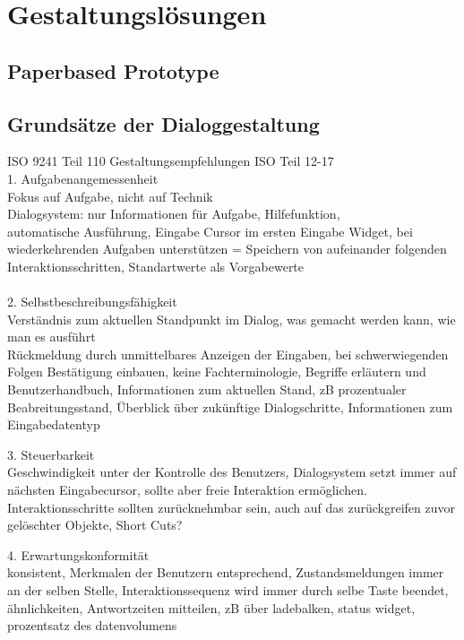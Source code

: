 
\section{Gestaltungslösungen}
\subsection{Paperbased Prototype}

\subsection{Grundsätze der Dialoggestaltung}
 ISO 9241 Teil 110
 Gestaltungsempfehlungen ISO Teil 12-17
\\
 1. Aufgabenangemessenheit\\
 	Fokus auf Aufgabe, nicht auf Technik\\
 	Dialogsystem: nur Informationen für Aufgabe, Hilfefunktion, \\automatische Ausführung, Eingabe Cursor im ersten Eingabe Widget, bei wiederkehrenden Aufgaben unterstützen = Speichern von aufeinander folgenden Interaktionsschritten, Standartwerte als Vorgabewerte\\
\\
 2. Selbstbeschreibungsfähigkeit\\
    Verständnis zum aktuellen Standpunkt im Dialog, was gemacht werden kann, wie man es ausführt\\
    Rückmeldung durch unmittelbares Anzeigen der Eingaben, bei schwerwiegenden Folgen Bestätigung einbauen, keine Fachterminologie, Begriffe erläutern und Benutzerhandbuch, Informationen zum aktuellen Stand, zB prozentualer Beabreitungsstand, Überblick über zukünftige Dialogschritte, Informationen zum Eingabedatentyp

 3. Steuerbarkeit\\
 	Geschwindigkeit unter der Kontrolle des Benutzers, Dialogsystem setzt immer auf nächsten Eingabecursor, sollte aber freie Interaktion ermöglichen. Interaktionsschritte sollten zurücknehmbar sein, auch auf das zurückgreifen zuvor gelöschter Objekte, Short Cuts?

 4. Erwartungskonformität\\
 	konsistent, Merkmalen der Benutzern entsprechend, Zustandsmeldungen immer an der selben Stelle, Interaktionssequenz wird immer durch selbe Taste beendet, ähnlichkeiten, Antwortzeiten mitteilen, zB über ladebalken, status widget, prozentsatz des datenvolumens

